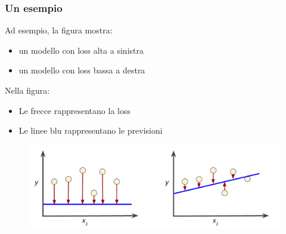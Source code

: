 \begin{frame}

	\frametitle{Un esempio}

		Ad esempio, la figura mostra:
		\begin{itemize}
			\item un modello con loss alta a sinistra
			\item un modello con loss bassa a destra
		\end{itemize}

		Nella figura:
		\begin{itemize}
			\item Le frecce rappresentano la loss
			\item Le linee blu rappresentano le previsioni
		\end{itemize}

		\begin{figure}[!htbp]
			\centering
			\includegraphics[width=12cm]{images/supervised/training_loss_role/LossSideBySide.png}
		\end{figure}


\end{frame}


